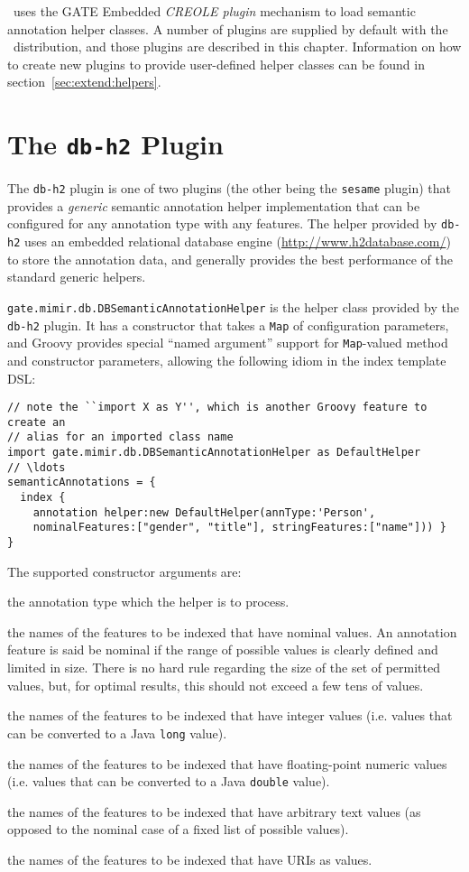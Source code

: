 \Mimir\ uses the GATE Embedded {\em CREOLE plugin} mechanism to load semantic
annotation helper classes.  A number of plugins are supplied by default with
the \Mimir\ distribution, and those plugins are described in this chapter.
Information on how to create new plugins to provide user-defined helper classes
can be found in section~\ref{sec:extend:helpers}.

\section{The {\tt db-h2} Plugin}\label{sec:plugins:db}

The {\tt db-h2} plugin is one of two plugins (the other being the {\tt sesame}
plugin) that provides a {\em generic} semantic annotation helper implementation
that can be configured for any annotation type with any features.  The helper
provided by {\tt db-h2} uses an embedded relational database engine
(\url{http://www.h2database.com/}) to store the annotation data, and generally
provides the best performance of the standard generic helpers.

\lstinline!gate.mimir.db.DBSemanticAnnotationHelper! is the helper class
provided by the {\tt db-h2} plugin.  It has a constructor that takes a
{\tt Map} of configuration parameters, and Groovy provides special ``named
argument'' support for {\tt Map}-valued method and constructor parameters,
allowing the following idiom in the index template DSL:
\begin{lstlisting}[texcl, breaklines, breakindent=150pt]
// note the ``import X as Y'', which is another Groovy feature to create an
// alias for an imported class name
import gate.mimir.db.DBSemanticAnnotationHelper as DefaultHelper
// \ldots
semanticAnnotations = {
  index {
    annotation helper:new DefaultHelper(annType:'Person',
    nominalFeatures:["gender", "title"], stringFeatures:["name"])) }
}
\end{lstlisting}

The supported constructor arguments are:
\bde
\item[annType:] the annotation type which the helper is to process.
\item[nominalFeatures:] the names of the features to be indexed that have
  nominal values. An annotation feature is said be nominal if the range of
  possible values is clearly defined and limited in size. There is no hard rule
  regarding the size of the set of permitted values, but, for optimal results,
  this should not exceed a few tens of values.
\item[integerFeatures:] the names of the features to be indexed that have
  integer values (i.e. values that can be converted to a Java {\tt long}
  value).
\item[floatFeatures:] the names of the features to be indexed that have
  floating-point numeric values (i.e. values that can be converted to a Java
  {\tt double} value).
\item[textFeatures:] the names of the features to be indexed that have
  arbitrary text values (as opposed to the nominal case of a fixed list of
  possible values).
\item[uriFeatures:] the names of the features to be indexed that have
  URIs as values.
\ede

